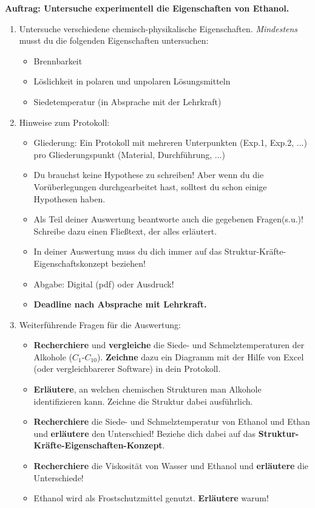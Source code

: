 \documentclass{scrartcl}  %
\begin{document}
				\noindent \textbf{Auftrag: Untersuche experimentell die Eigenschaften von Ethanol.}
				\begin{enumerate}
					\item Untersuche verschiedene chemisch-physikalische Eigenschaften. \textit{Mindestens} musst du die folgenden Eigenschaften untersuchen:
						\begin{itemize}
							\item Brennbarkeit
							\item Löslichkeit in polaren und unpolaren Lösungsmitteln
							\item Siedetemperatur (in Absprache mit der Lehrkraft)
						\end{itemize}
					\item Hinweise zum Protokoll:
						\begin{itemize}
							\item Gliederung: Ein Protokoll mit mehreren Unterpunkten (Exp.1, Exp.2, ...) pro Gliederungspunkt (Material, Durchführung, ...)
							\item Du brauchst keine Hypothese zu schreiben! Aber wenn du die Vorüberlegungen durchgearbeitet hast, solltest du schon einige Hypothesen haben.
							\item  Als Teil deiner Auswertung beantworte auch die gegebenen Fragen(s.u.)! Schreibe dazu einen Fließtext, der alles erläutert.
							\item In deiner Auswertung muss du dich immer auf das Struktur-Kräfte-Eigenschaftskonzept beziehen!
							\item Abgabe: Digital (pdf) oder Ausdruck!
							\item \textbf{Deadline nach Absprache mit Lehrkraft.}
						\end{itemize}
					\item Weiterführende Fragen für die Auswertung:
						\begin{itemize}
							\item \textbf{Recherchiere} und \textbf{vergleiche} die Siede- und Schmelztemperaturen der Alkohole ($ C_{1} $-$ C_{10} $). \textbf{Zeichne} dazu ein Diagramm mit der Hilfe von Excel (oder vergleichbarerer Software) in dein Protokoll.
							\item \textbf{Erläutere}, an welchen chemischen Strukturen man Alkohole identifizieren kann. Zeichne die Struktur dabei ausführlich.
							\item \textbf{Recherchiere} die Siede- und Schmelztemperatur von Ethanol und Ethan und \textbf{erläutere} den Unterschied! Beziehe dich dabei auf das \textbf{Struktur-Kräfte-Eigenschaften-Konzept}.
							\item \textbf{Recherchiere} die Viskosität von Wasser und Ethanol und \textbf{erläutere} die Unterschiede!
							\item Ethanol wird als Frostschutzmittel genutzt. \textbf{Erläutere} warum!
						\end{itemize}
				\end{enumerate}
\newpage
\end{document}
